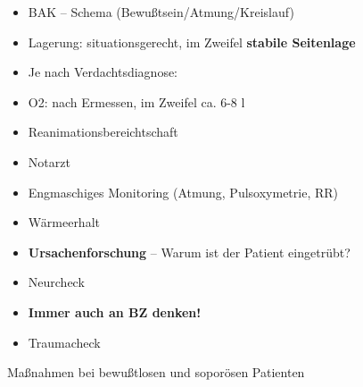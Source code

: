 \documentclass{article}
\newcommand\gEs[1]{\textbf{\textcolor[rgb]{0.0,0.0,0.5019608}{#1}}}
\newcommand\gEs[1]{\textbf{\textcolor[rgb]{0.0,0.0,0.5019608}{#1}}}
\begin{document}
\begin{itemize}
\item {\mdseries\color[rgb]{0.0,0.0,0.5019608}
BAK -- Schema  (Bewu{\ss}tsein/Atmung/Kreislauf)}

\item {\mdseries\color[rgb]{0.0,0.0,0.5019608}
Lagerung: situationsgerecht, im Zweifel \gEs{stabile
Seitenlage }}

\item {\mdseries\color[rgb]{0.0,0.0,0.5019608}
Je nach Verdachtsdiagnose: }

\end{itemize}
\begin{itemize}
\item {\mdseries\color[rgb]{0.0,0.0,0.5019608}
O2: nach Ermessen, im Zweifel ca. 6-8 l}

\item {\mdseries\color[rgb]{0.0,0.0,0.5019608}
Reanimationsbereichtschaft}

\item {\mdseries\color[rgb]{0.0,0.0,0.5019608}
Notarzt }

\end{itemize}
\begin{itemize}
\item {\mdseries\color[rgb]{0.0,0.0,0.5019608}
Engmaschiges Monitoring (Atmung, Pulsoxymetrie, RR)}

\item {\mdseries\color[rgb]{0.0,0.0,0.5019608}
W\"armeerhalt}

\item {\mdseries\color[rgb]{0.0,0.0,0.5019608}
\gEs{Ursachenforschung} -- Warum ist der Patient
eingetr\"ubt?}

\item {\mdseries\color[rgb]{0.0,0.0,0.5019608}
Neurcheck}

\end{itemize}
\begin{itemize}
\item {\mdseries\color[rgb]{0.0,0.0,0.5019608}
\gEs{Immer auch an BZ denken!}}

\end{itemize}
\begin{itemize}
\item {\mdseries\color[rgb]{0.0,0.0,0.5019608}
Traumacheck}

\end{itemize}
{\mdseries\color{black}
Ma{\ss}nahmen bei bewu{\ss}tlosen und sopor\"osen Patienten}
\end{document}
